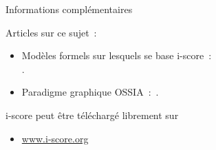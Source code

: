 \begin{block}{Informations complémentaires}
      {Articles sur ce sujet~:
      \begin{itemize}
        \item Modèles formels sur lesquels se base i-score~:~\\\cite{allombert_system_2007,arias_modelling_2014}.
        \item Paradigme graphique OSSIA~:~\cite{celerier_ossia:_2015}.
      \end{itemize}
      \vspace{0.1in}\noindent i-score peut être téléchargé librement sur
      \begin{itemize}
        \item \url{www.i-score.org}
      \end{itemize}}
\end{block}